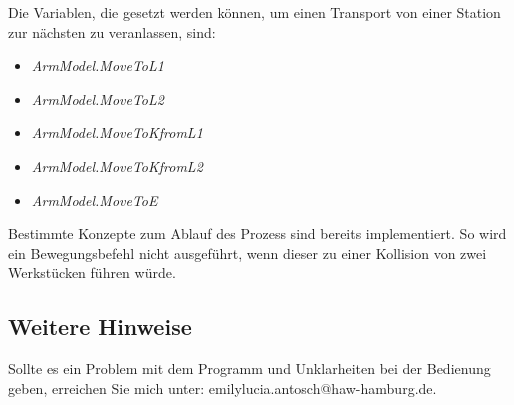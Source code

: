 \documentclass{report}
\begin{document}
Die Variablen, die gesetzt werden können, um einen Transport von einer Station zur nächsten zu veranlassen, sind:

\begin{itemize}
  \item \textit{ArmModel.MoveToL1}
  \item \textit{ArmModel.MoveToL2}
  \item \textit{ArmModel.MoveToKfromL1}
  \item \textit{ArmModel.MoveToKfromL2}
  \item \textit{ArmModel.MoveToE}
\end{itemize}

Bestimmte Konzepte zum Ablauf des Prozess sind bereits implementiert. So wird ein Bewegungsbefehl nicht ausgeführt, wenn dieser zu einer Kollision von zwei Werkstücken führen würde.

\subsection{Weitere Hinweise}

Sollte es ein Problem mit dem Programm und Unklarheiten bei der Bedienung geben, erreichen Sie mich unter: emilylucia.antosch@haw-hamburg.de. 
\end{document}
